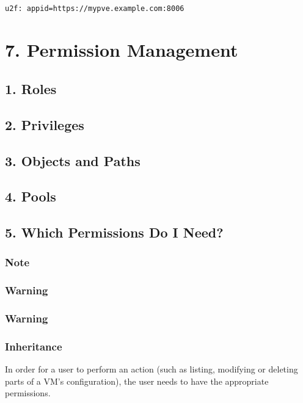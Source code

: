 \begin{lstlisting}

u2f: appid=https://mypve.example.com:8006

\end{lstlisting}


\section{7. Permission Management}

\subsection{1. Roles}

\subsection{2. Privileges}

\subsection{3. Objects and Paths}

\subsection{4. Pools}

\subsection{5. Which Permissions Do I Need?}

\subsubsection{Note}

\subsubsection{Warning}

\subsubsection{Warning}

\subsubsection{Inheritance}

In order for a user to perform an action (such as listing, modifying or deleting parts of a VM’s configuration), the user needs to have the appropriate permissions.

